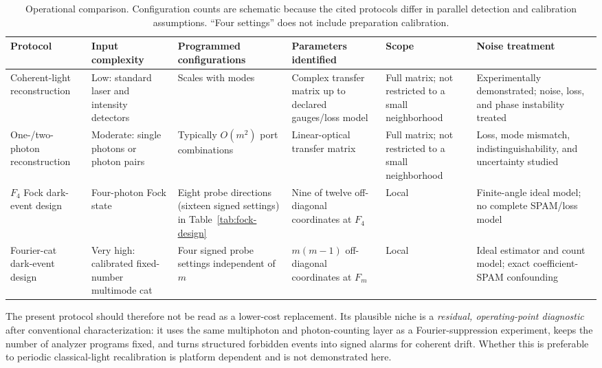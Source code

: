 \documentclass[aps,pra,reprint,amsmath,amssymb,superscriptaddress,longbibliography]{revtex4-2}
\begin{document}
\begin{table}[t]
\caption{Operational comparison.  Configuration counts are schematic
because the cited protocols differ in parallel detection and calibration
assumptions.  ``Four settings'' does not include preparation calibration.}
\label{tab:protocol-comparison}
\scriptsize
\begin{ruledtabular}
\begin{tabular}{p{2.5cm}p{2.6cm}p{2.3cm}p{3.1cm}p{1.5cm}p{3.2cm}}
Protocol&Input complexity&Programmed configurations&Parameters identified&
Scope&Noise treatment\\
\hline
Coherent-light reconstruction
\cite{RahimiKeshari2013,Suess2020,Hoch2023}&
Low: standard laser and intensity detectors&
Scales with modes&
Complex transfer matrix up to declared gauges/loss model&
Full matrix; not restricted to a small neighborhood&
Experimentally demonstrated; noise, loss, and phase instability treated\\
One-/two-photon reconstruction
\cite{LaingOBrien2012,Dhand2016,Biriukov2026}&
Moderate: single photons or photon pairs&
Typically $O(m^2)$ port combinations&
Linear-optical transfer matrix&
Full matrix; not restricted to a small neighborhood&
Loss, mode mismatch, indistinguishability, and uncertainty studied\\
$F_4$ Fock dark-event design&
Four-photon Fock state&
Eight probe directions (sixteen signed settings) in Table~\ref{tab:fock-design}&
Nine of twelve off-diagonal coordinates at $F_4$&
Local&
Finite-angle ideal model; no complete SPAM/loss model\\
Fourier-cat dark-event design&
Very high: calibrated fixed-number multimode cat&
Four signed probe settings independent of $m$&
$m(m-1)$ off-diagonal coordinates at $F_m$&
Local&
Ideal estimator and count model; exact coefficient-SPAM confounding\\
\end{tabular}
\end{ruledtabular}
\end{table}

The present protocol should therefore not be read as a lower-cost
replacement.  Its plausible niche is a \emph{residual, operating-point
diagnostic} after conventional characterization: it uses the same
multiphoton and photon-counting layer as a Fourier-suppression experiment,
keeps the number of analyzer programs fixed, and turns structured forbidden
events into signed alarms for coherent drift.  Whether this is preferable
to periodic classical-light recalibration is platform dependent and is not
demonstrated here.
\end{document}
